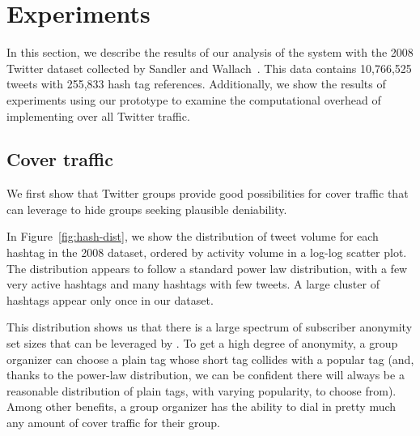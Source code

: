 \section{Experiments}
\label{sec:experiments}

In this section, we describe the results of our analysis of the \hoot
system with the 2008 Twitter dataset collected by Sandler and Wallach~\cite{sandler09}. This data contains 10,766,525 tweets with 255,833 hash tag references. Additionally, we show the results of experiments using our
prototype to examine the computational overhead of implementing \hoot
over all Twitter traffic.

\subsection{Cover traffic}
We first show that Twitter groups provide good possibilities for cover
traffic that \hoot can leverage to hide groups seeking plausible
deniability.

In Figure~\ref{fig:hash-dist}, we show the distribution of 
tweet volume for each hashtag in the 2008 dataset, ordered by activity
volume in a log-log scatter plot. The
distribution appears to follow a standard power law distribution, with a
few very active hashtags and many hashtags with few tweets. A large
cluster of hashtags appear only once in our dataset. 

This distribution shows us that there is a large spectrum of subscriber
anonymity set sizes that can be leveraged by \hoot. To get a high
degree of anonymity, a group organizer can choose a plain tag whose short tag
collides with a popular tag (and, thanks to the power-law
distribution, we can be confident there will always be a reasonable
distribution of plain tags, with varying popularity, to choose from).
Among other benefits, a group organizer has the ability to dial in
pretty much any amount of cover traffic for their group.


